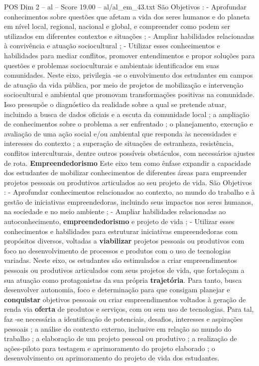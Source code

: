\begin{textsample}{POS Dim 2 – al – Score 19.00 – al/al\_em\_43.txt}
São Objetivos : - Aprofundar conhecimentos sobre questões que afetam a vida dos seres humanos e do planeta em nível local, regional, nacional e global, e compreender como podem ser utilizados em diferentes contextos e situações ; - Ampliar habilidades relacionadas à convivência e atuação sociocultural ; - Utilizar esses conhecimentos e habilidades para mediar conflitos, promover entendimentos e propor soluções para questões e problemas socioculturais e ambientais identificados em suas comunidades.
Neste eixo, privilegia -se o envolvimento dos estudantes em campos de atuação da vida pública, por meio de projetos de mobilização e intervenção sociocultural e ambiental que promovam transformações positivas na comunidade.
Isso pressupõe o diagnóstico da realidade sobre a qual se pretende atuar, incluindo a busca de dados oficiais e a escuta da comunidade local ; a ampliação de conhecimentos sobre o problema a ser enfrentado ; o planejamento, execução e avaliação de uma ação social e/ou ambiental que responda às necessidades e interesses do contexto ; a superação de situações de estranheza, resistência, conflitos interculturais, dentre outros possíveis obstáculos, com necessários ajustes de rota. \textbf{Empreendedorismo} Este eixo tem como ênfase expandir a capacidade dos estudantes de mobilizar conhecimentos de diferentes áreas para empreender projetos pessoais ou produtivos articulados ao seu projeto de vida.
São Objetivos : - Aprofundar conhecimentos relacionados ao contexto, ao mundo do trabalho e à gestão de iniciativas empreendedoras, incluindo seus impactos nos seres humanos, na sociedade e no meio ambiente ; - Ampliar habilidades relacionadas ao autoconhecimento, \textbf{empreendedorismo} e projeto de vida ; - Utilizar esses conhecimentos e habilidades para estruturar iniciativas empreendedoras com propósitos diversos, voltadas a \textbf{viabilizar} projetos pessoais ou produtivos com foco no desenvolvimento de processos e produtos com o uso de tecnologias variadas.
Neste eixo, os estudantes são estimulados a criar empreendimentos pessoais ou produtivos articulados com seus projetos de vida, que fortaleçam a sua atuação como protagonistas da sua própria \textbf{trajetória}.
Para tanto, busca desenvolver autonomia, foco e determinação para que consigam planejar e \textbf{conquistar} objetivos pessoais ou criar empreendimentos voltados à geração de renda via \textbf{oferta} de produtos e serviços, com ou sem uso de tecnologias.
Para tal, faz -se necessária a identificação de potenciais, desafios, interesses e aspirações pessoais ; a análise do contexto externo, inclusive em relação ao mundo do trabalho ; a elaboração de um projeto pessoal ou produtivo ; a realização de ações-piloto para testagem e aprimoramento do projeto elaborado ; o desenvolvimento ou aprimoramento do projeto de vida dos estudantes.

\end{textsample}
